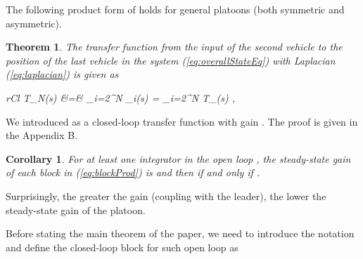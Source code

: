 \documentclass[technote, 10pt, twoside]{IEEEtran}
\newcommand{\weightGain}{\mu}
\newcommand{\lapDom}{s}
\newcommand{\wn}{i}
\newcommand{\numVeh}{N}
\newcommand{\diagTransBlock}{{F}}
\newcommand{\diagTransBlockWn}{\diagTransBlock_{\wn}}
\newcommand{\diagTransBlockEig}{T}
\newcommand{\diagTransBlockEigWn}{\diagTransBlockEig_{\spatEigWn}}
\newcommand{\diagTransBlockN}{\diagTransBlockEig_{\numVeh}}
\theoremstyle{plain}
\newtheorem{theorem}{Theorem}
\newtheorem{corollary}{Corollary}
\theoremstyle{definition}
\theoremstyle{assump}
\begin{document}
The following product form of  holds for general platoons
(both symmetric and asymmetric).
\begin{theorem} The transfer function from the input of the second vehicle to the
	position of the last vehicle in the system (\ref{eq:overallStateEq}) with
	Laplacian (\ref{eq:laplacian}) is given as
	\begin{IEEEeqnarray}{rCl}
		\diagTransBlockN(\lapDom) &=& \frac{1}{\weightGain_2} \prod_{\wn=2}^{\numVeh}
		\spatEigWn \diagTransBlockWn(\lapDom) =\frac{1}{\weightGain_2} \prod_{\wn=2}^{\numVeh}
		\diagTransBlockEigWn(\lapDom) 
,
		\label{eq:blockProd}
	\end{IEEEeqnarray}
	\label{lem:blockProd} 
\end{theorem} 
\vspace{-15pt}

We introduced
 as a
closed-loop transfer function with gain . The proof is given in the
Appendix B.
\begin{corollary} 
	For at least one integrator in the open loop ,
	the steady-state gain of each block in (\ref{eq:blockProd})
	is  and then 
	if and only if .
\end{corollary}
Surprisingly, the greater the gain  (coupling with the
leader), the lower the steady-state gain of the platoon.
 
Before stating the main theorem of the paper, we need to introduce the notation
  and define the closed-loop block
for such open loop as
\end{document}
